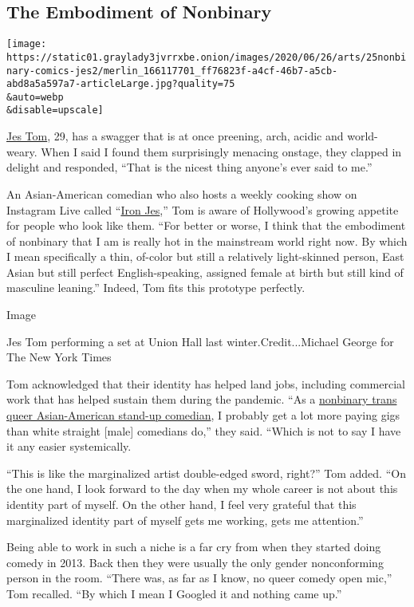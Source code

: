 \hypertarget{the-embodiment-of-nonbinary}{%
\subsection{The Embodiment of
Nonbinary}\label{the-embodiment-of-nonbinary}}

\texttt{[image: https://static01.graylady3jvrrxbe.onion/images/2020/06/26/arts/25nonbinary-comics-jes2/merlin\_166117701\_ff76823f-a4cf-46b7-a5cb-abd8a5a597a7-articleLarge.jpg?quality=75\\\&auto=webp\\\&disable=upscale]}

\href{https://www.jestomdotcom.com/}{Jes Tom}, 29, has a swagger that is
at once preening, arch, acidic and world-weary. When I said I found them
surprisingly menacing onstage, they clapped in delight and responded,
``That is the nicest thing anyone's ever said to me.''

An Asian-American comedian who also hosts a weekly cooking show on
Instagram Live called
``\href{https://www.instagram.com/p/CBjfafOjRAR/}{Iron Jes},'' Tom is
aware of Hollywood's growing appetite for people who look like them.
``For better or worse, I think that the embodiment of nonbinary that I
am is really hot in the mainstream world right now. By which I mean
specifically a thin, of-color but still a relatively light-skinned
person, East Asian but still perfect English-speaking, assigned female
at birth but still kind of masculine leaning.'' Indeed, Tom fits this
prototype perfectly.

Image

Jes Tom performing a set at Union Hall last winter.Credit...Michael
George for The New York Times

Tom acknowledged that their identity has helped land jobs, including
commercial work that has helped sustain them during the pandemic. ``As a
\href{https://www.youtube.com/watch?v=htU38RhRmto}{nonbinary trans queer
Asian-American stand-up comedian}, I probably get a lot more paying gigs
than white straight {[}male{]} comedians do,'' they said. ``Which is not
to say I have it any easier systemically.

``This is like the marginalized artist double-edged sword, right?'' Tom
added. ``On the one hand, I look forward to the day when my whole career
is not about this identity part of myself. On the other hand, I feel
very grateful that this marginalized identity part of myself gets me
working, gets me attention.''

Being able to work in such a niche is a far cry from when they started
doing comedy in 2013. Back then they were usually the only gender
nonconforming person in the room. ``There was, as far as I know, no
queer comedy open mic,'' Tom recalled. ``By which I mean I Googled it
and nothing came up.''

